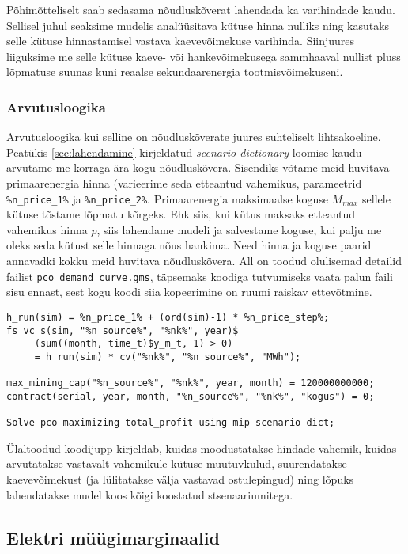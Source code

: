 \documentclass[10pt,a4paper]{article}
\begin{document}
Põhimõtteliselt saab sedasama nõudluskõverat lahendada ka varihindade kaudu. Sellisel juhul seaksime mudelis analüüsitava kütuse hinna nulliks ning kasutaks selle kütuse hinnastamisel vastava kaevevõimekuse varihinda. Siinjuures liiguksime me selle kütuse kaeve- või hankevõimekusega sammhaaval nullist pluss lõpmatuse suunas kuni reaalse sekundaarenergia tootmisvõimekuseni.
\subsubsection{Arvutusloogika}
Arvutusloogika kui selline on nõudluskõverate juures suhteliselt lihtsakoeline. Peatükis \ref{sec:lahendamine} kirjeldatud \emph{scenario dictionary} loomise kaudu arvutame me korraga ära kogu nõudluskõvera. Sisendiks võtame meid huvitava primaarenergia hinna (varieerime seda etteantud vahemikus, parameetrid \texttt{\%n\_price\_1\%} ja \texttt{\%n\_price\_2\%}. Primaarenergia maksimaalse koguse $\mathit{M}_{max}$ sellele kütuse tõstame lõpmatu kõrgeks. Ehk siis, kui kütus maksaks etteantud vahemikus hinna $p$, siis lahendame mudeli ja salvestame koguse, kui palju me oleks seda kütust selle hinnaga nõus hankima. Need hinna ja koguse paarid annavadki kokku meid huvitava nõudluskõvera. All on toodud olulisemad detailid failist \texttt{pco\_demand\_curve.gms}, täpsemaks koodiga tutvumiseks vaata palun faili sisu ennast, sest kogu koodi siia kopeerimine on ruumi raiskav ettevõtmine. 
\begin{verbatim}
h_run(sim) = %n_price_1% + (ord(sim)-1) * %n_price_step%;  
fs_vc_s(sim, "%n_source%", "%nk%", year)$
     (sum((month, time_t)$y_m_t, 1) > 0) 
     = h_run(sim) * cv("%nk%", "%n_source%", "MWh");   

max_mining_cap("%n_source%", "%nk%", year, month) = 120000000000;
contract(serial, year, month, "%n_source%", "%nk%", "kogus") = 0;

Solve pco maximizing total_profit using mip scenario dict;   
\end{verbatim}

Ülaltoodud koodijupp kirjeldab, kuidas moodustatakse hindade vahemik, kuidas arvutatakse vastavalt vahemikule kütuse muutuvkulud, suurendatakse kaevevõimekust (ja lülitatakse välja vastavad ostulepingud) ning lõpuks lahendatakse mudel koos kõigi koostatud stsenaariumitega.

\subsection{Elektri müügimarginaalid}
\end{document}
